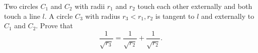 Two circles $C_1$ and $C_2$ with radii $r_1$ and $r_2$ touch each other externally and both touch a line $l$. A circle $C_3$ with radius $r_3 < r_1, r_2$ is tangent to $l$ and externally to $C_1$ and $C_2$. Prove that\[\frac{1}{\sqrt{r_3}}=\frac{1}{\sqrt{r_2}}+\frac{1}{\sqrt{r_2}}.\]